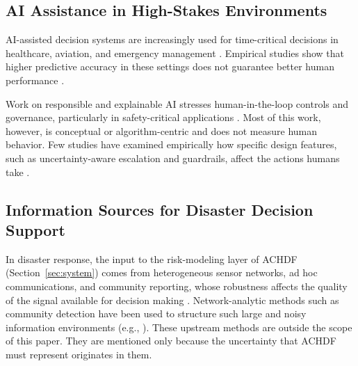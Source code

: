 \documentclass[journal]{IEEEtran}
\theoremstyle{plain}
\theoremstyle{definition}
\begin{document}
\subsection{AI Assistance in High-Stakes Environments}
AI-assisted decision systems are increasingly used for time-critical decisions in healthcare, aviation, and emergency management \cite{PerezCerrolaza2024CSUR,Bach2024Access,Rokhideh2025IJDRS,Rao2024IJDRS}. Empirical studies show that higher predictive accuracy in these settings does not guarantee better human performance \cite{Lai2023FAccT,Yang2022THMSReview}.

Work on responsible and explainable AI stresses human-in-the-loop controls and governance, particularly in safety-critical applications \cite{Weidinger2022FAccT,Assaad2023TAS,Miller2019XRDS,PerezCerrolaza2024CSUR}. Most of this work, however, is conceptual or algorithm-centric and does not measure human behavior. Few studies have examined empirically how specific design features, such as uncertainty-aware escalation and guardrails, affect the actions humans take \cite{Bach2024Access,Lai2023FAccT}.

\subsection{Information Sources for Disaster Decision Support}
In disaster response, the input to the risk-modeling layer of ACHDF (Section~\ref{sec:system}) comes from heterogeneous sensor networks, ad hoc communications, and community reporting, whose robustness affects the quality of the signal available for decision making \cite{Yang2005MobiHoc,Longo2025PMC,Stephens2022SIGDOC}. Network-analytic methods such as community detection have been used to structure such large and noisy information environments (e.g., \cite{Wakita2007WWW,Havens2013TFUZZ}). These upstream methods are outside the scope of this paper. They are mentioned only because the uncertainty that ACHDF must represent originates in them.


\end{document}
